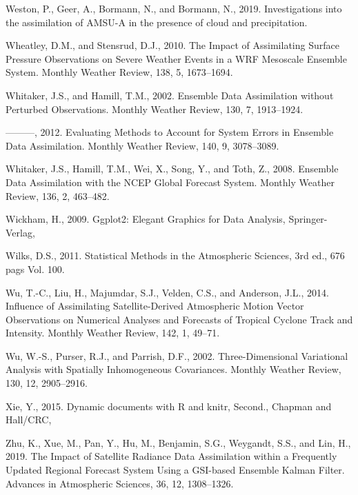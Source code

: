 \documentclass[12pt,oneside,a4paper]{reedthesis}
\begin{document}
\leavevmode\hypertarget{ref-weston2019}{}%
Weston, P., Geer, A., Bormann, N., and Bormann, N., 2019. Investigations into the assimilation of AMSU-A in the presence of cloud and precipitation.

\leavevmode\hypertarget{ref-wheatley2010}{}%
Wheatley, D.M., and Stensrud, D.J., 2010. The Impact of Assimilating Surface Pressure Observations on Severe Weather Events in a WRF Mesoscale Ensemble System. Monthly Weather Review, 138, 5, 1673--1694.

\leavevmode\hypertarget{ref-whitaker2002}{}%
Whitaker, J.S., and Hamill, T.M., 2002. Ensemble Data Assimilation without Perturbed Observations. Monthly Weather Review, 130, 7, 1913--1924.

\leavevmode\hypertarget{ref-whitaker2012}{}%
---------, 2012. Evaluating Methods to Account for System Errors in Ensemble Data Assimilation. Monthly Weather Review, 140, 9, 3078--3089.

\leavevmode\hypertarget{ref-whitaker2008}{}%
Whitaker, J.S., Hamill, T.M., Wei, X., Song, Y., and Toth, Z., 2008. Ensemble Data Assimilation with the NCEP Global Forecast System. Monthly Weather Review, 136, 2, 463--482.

\leavevmode\hypertarget{ref-wickham2009}{}%
Wickham, H., 2009. Ggplot2: Elegant Graphics for Data Analysis, Springer-Verlag,

\leavevmode\hypertarget{ref-wilks2011}{}%
Wilks, D.S., 2011. Statistical Methods in the Atmospheric Sciences, 3rd ed., 676 pags Vol. 100.

\leavevmode\hypertarget{ref-wu2014}{}%
Wu, T.-C., Liu, H., Majumdar, S.J., Velden, C.S., and Anderson, J.L., 2014. Influence of Assimilating Satellite-Derived Atmospheric Motion Vector Observations on Numerical Analyses and Forecasts of Tropical Cyclone Track and Intensity. Monthly Weather Review, 142, 1, 49--71.

\leavevmode\hypertarget{ref-wu2002}{}%
Wu, W.-S., Purser, R.J., and Parrish, D.F., 2002. Three-Dimensional Variational Analysis with Spatially Inhomogeneous Covariances. Monthly Weather Review, 130, 12, 2905--2916.

\leavevmode\hypertarget{ref-xie2015}{}%
Xie, Y., 2015. Dynamic documents with R and knitr, Second., Chapman and Hall/CRC,

\leavevmode\hypertarget{ref-zhu2019}{}%
Zhu, K., Xue, M., Pan, Y., Hu, M., Benjamin, S.G., Weygandt, S.S., and Lin, H., 2019. The Impact of Satellite Radiance Data Assimilation within a Frequently Updated Regional Forecast System Using a GSI-based Ensemble Kalman Filter. Advances in Atmospheric Sciences, 36, 12, 1308--1326.
\end{document}
